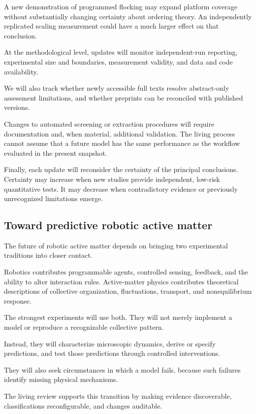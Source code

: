 A new demonstration
of programmed flocking
may expand platform
coverage without
substantially changing
certainty about
ordering theory.
An independently
replicated scaling
measurement could
have a much
larger effect
on that conclusion.

At the methodological
level, updates will
monitor independent-run
reporting, experimental
size and boundaries,
measurement validity,
and data and
code availability.

We will also track
whether newly accessible
full texts resolve
abstract-only
assessment limitations,
and whether preprints
can be reconciled
with published versions.

Changes to automated
screening or extraction
procedures will require
documentation and,
when material,
additional validation.
The living process
cannot assume that
a future model
has the same
performance as
the workflow
evaluated in
the present snapshot.

Finally, each update
will reconsider
the certainty
of the principal
conclusions.
Certainty may
increase when
new studies
provide independent,
low-risk
quantitative tests.
It may decrease
when contradictory
evidence or
previously unrecognized
limitations emerge.

\subsection{Toward predictive robotic active matter}
\label{sec:outlook-conclusion}

The future of robotic active matter
depends on bringing two experimental
traditions into closer contact.

Robotics contributes programmable
agents, controlled sensing,
feedback, and the ability
to alter interaction rules.
Active-matter physics contributes
theoretical descriptions of
collective organization,
fluctuations, transport,
and nonequilibrium response.

The strongest experiments
will use both.
They will not merely
implement a model
or reproduce
a recognizable
collective pattern.

Instead, they will
characterize microscopic
dynamics, derive or
specify predictions,
and test those
predictions through
controlled interventions.

They will also
seek circumstances
in which a model
fails, because
such failures
identify missing
physical mechanisms.

The living review
supports this
transition by
making evidence
discoverable,
classifications
reconfigurable,
and changes
auditable.

